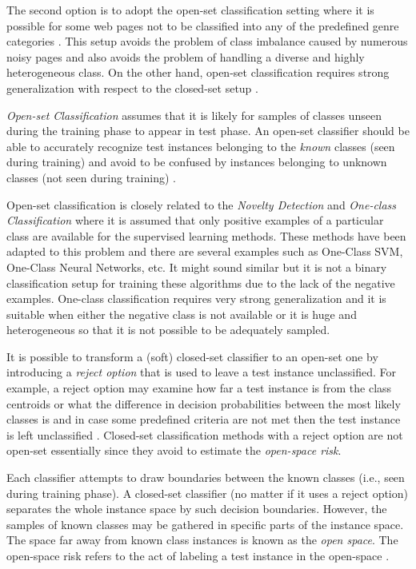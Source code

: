 \begin{itemize}
The second option is to adopt the open-set classification setting where it is possible for some web pages not to be classified into any of the predefined genre categories \parencite{stubbe2007genre,pritsos2013open}. This setup avoids the problem of class imbalance caused by numerous noisy pages and also avoids the problem of handling a diverse and highly heterogeneous class. On the other hand, open-set classification requires strong generalization with respect to the closed-set setup \parencite{scheirer2013toward}.

\begin{definition}{\textit{Open-set Classification}}
assumes that it is likely for samples of classes unseen during the training phase to appear in test phase. An open-set classifier should be able to accurately recognize test instances belonging to the \textit{known} classes (seen during training) and avoid to be confused by instances belonging to unknown classes (not seen during training) \parencite{geng2018recent}.
\end{definition}

Open-set classification is closely related to the \textit{Novelty Detection} and \textit{One-class Classification} where it is assumed that only positive examples of a particular class are available for the supervised learning methods. These methods have been adapted to this problem and there are several examples such as One-Class SVM, One-Class Neural Networks, etc. It might sound similar but it is not a binary classification setup for training these algorithms due to the lack of the negative examples. One-class classification requires very strong generalization and it is suitable when either the negative class is not available or it is huge and heterogeneous so that it is not possible to be adequately sampled. 

It is possible to transform a (soft) closed-set classifier to an open-set one by introducing a \textit{reject option} that is used to leave a test instance unclassified. For example, a reject option may examine how far a test instance is from the class centroids or what the difference in decision probabilities between the most likely classes is and in case some predefined criteria are not met then the test instance is left unclassified \parencite{onan2018ensemble}. Closed-set classification methods with a reject option are not open-set essentially since they avoid to estimate the \textit{open-space risk}.

Each classifier attempts to draw boundaries between the known classes (i.e., seen during training phase). A closed-set classifier (no matter if it uses a reject option) separates the whole instance space by such decision boundaries. However, the samples of known classes may be gathered in specific parts of the instance space. The space far away from known class instances is known as the \textit{open space}. The open-space risk refers to the act of labeling a test instance in the open-space \parencite{geng2018recent}. 


\end{itemize}
